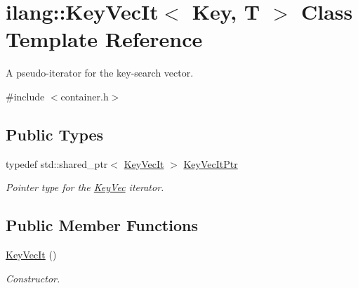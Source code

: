 \hypertarget{classilang_1_1_key_vec_it}{}\section{ilang\+:\+:Key\+Vec\+It$<$ Key, T $>$ Class Template Reference}
\label{classilang_1_1_key_vec_it}


A pseudo-\/iterator for the key-\/search vector.  




{\ttfamily \#include $<$container.\+h$>$}

\subsection*{Public Types}
\begin{DoxyCompactItemize}
\item 
\mbox{\label{classilang_1_1_key_vec_it_a357b858de2442e15b0613ac90f5214f1}} 
typedef std\+::shared\+\_\+ptr$<$ \mbox{\hyperlink{classilang_1_1_key_vec_it}{Key\+Vec\+It}} $>$ \mbox{\hyperlink{classilang_1_1_key_vec_it_a357b858de2442e15b0613ac90f5214f1}{Key\+Vec\+It\+Ptr}}
\begin{DoxyCompactList}\small\item\em Pointer type for the \mbox{\hyperlink{classilang_1_1_key_vec}{Key\+Vec}} iterator. \end{DoxyCompactList}\end{DoxyCompactItemize}
\subsection*{Public Member Functions}
\begin{DoxyCompactItemize}
\item 
\mbox{\label{classilang_1_1_key_vec_it_a44bb19d64d2ea6ca2dcdd6f4f3a44cc7}} 
\mbox{\hyperlink{classilang_1_1_key_vec_it_a44bb19d64d2ea6ca2dcdd6f4f3a44cc7}{Key\+Vec\+It}} ()
\begin{DoxyCompactList}\small\item\em Constructor. \end{DoxyCompactList}\end{DoxyCompactItemize}

